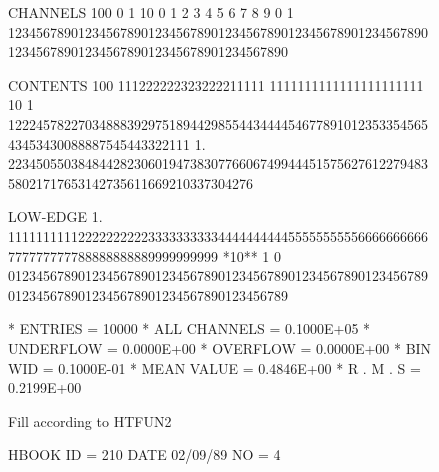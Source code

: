 \begin{figure}[p]
\begin{XMPfrac}{3.3}
CHANNELS 100   0                                                                                                  1
          10   0        1         2         3         4         5         6         7         8         9         0
           1   1234567890123456789012345678901234567890123456789012345678901234567890123456789012345678901234567890
 
CONTENTS 100                       111222222323222211111                  1111111111111111111111
          10             1 12224578227034888392975189442985544344445467789101235335456543453430088887545443322111
           1.       22345055038484428230601947383077660674994445157562761227948358021717653142735611669210337304276
 
LOW-EDGE   1.            111111111122222222223333333333444444444455555555556666666666777777777788888888889999999999
*10**  1   0   0123456789012345678901234567890123456789012345678901234567890123456789012345678901234567890123456789
 
* ENTRIES =      10000      * ALL CHANNELS = 0.1000E+05      * UNDERFLOW = 0.0000E+00      * OVERFLOW = 0.0000E+00
* BIN WID = 0.1000E-01      * MEAN VALUE   = 0.4846E+00      * R . M . S = 0.2199E+00
\end{XMPfrac}   
\NODOC{\end{minipage}\hfill}
\begin{XMPfrac}{3.3}
Fill according to HTFUN2
 
HBOOK     ID =       210                                        DATE  02/09/89               NO =  4
 

\end{XMPfrac}
\end{figure}

